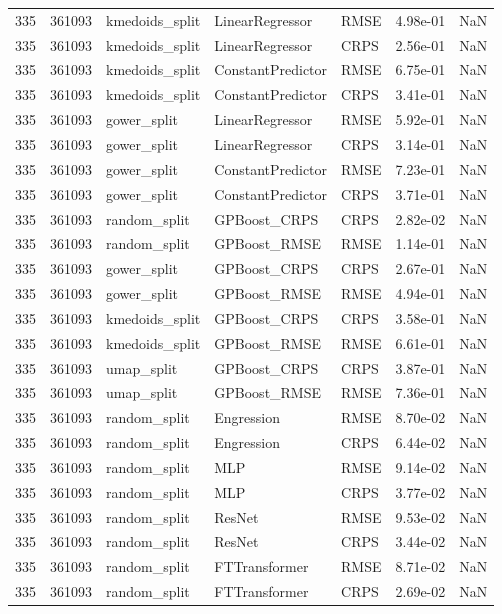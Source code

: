 \begin{tabular}{rrlllrr}
335 & 361093 & kmedoids\_split & LinearRegressor & RMSE & 4.98e-01 & NaN \\
335 & 361093 & kmedoids\_split & LinearRegressor & CRPS & 2.56e-01 & NaN \\
335 & 361093 & kmedoids\_split & ConstantPredictor & RMSE & 6.75e-01 & NaN \\
335 & 361093 & kmedoids\_split & ConstantPredictor & CRPS & 3.41e-01 & NaN \\
335 & 361093 & gower\_split & LinearRegressor & RMSE & 5.92e-01 & NaN \\
335 & 361093 & gower\_split & LinearRegressor & CRPS & 3.14e-01 & NaN \\
335 & 361093 & gower\_split & ConstantPredictor & RMSE & 7.23e-01 & NaN \\
335 & 361093 & gower\_split & ConstantPredictor & CRPS & 3.71e-01 & NaN \\
335 & 361093 & random\_split & GPBoost\_CRPS & CRPS & 2.82e-02 & NaN \\
335 & 361093 & random\_split & GPBoost\_RMSE & RMSE & 1.14e-01 & NaN \\
335 & 361093 & gower\_split & GPBoost\_CRPS & CRPS & 2.67e-01 & NaN \\
335 & 361093 & gower\_split & GPBoost\_RMSE & RMSE & 4.94e-01 & NaN \\
335 & 361093 & kmedoids\_split & GPBoost\_CRPS & CRPS & 3.58e-01 & NaN \\
335 & 361093 & kmedoids\_split & GPBoost\_RMSE & RMSE & 6.61e-01 & NaN \\
335 & 361093 & umap\_split & GPBoost\_CRPS & CRPS & 3.87e-01 & NaN \\
335 & 361093 & umap\_split & GPBoost\_RMSE & RMSE & 7.36e-01 & NaN \\
335 & 361093 & random\_split & Engression & RMSE & 8.70e-02 & NaN \\
335 & 361093 & random\_split & Engression & CRPS & 6.44e-02 & NaN \\
335 & 361093 & random\_split & MLP & RMSE & 9.14e-02 & NaN \\
335 & 361093 & random\_split & MLP & CRPS & 3.77e-02 & NaN \\
335 & 361093 & random\_split & ResNet & RMSE & 9.53e-02 & NaN \\
335 & 361093 & random\_split & ResNet & CRPS & 3.44e-02 & NaN \\
335 & 361093 & random\_split & FTTransformer & RMSE & 8.71e-02 & NaN \\
335 & 361093 & random\_split & FTTransformer & CRPS & 2.69e-02 & NaN \\

\end{tabular}
